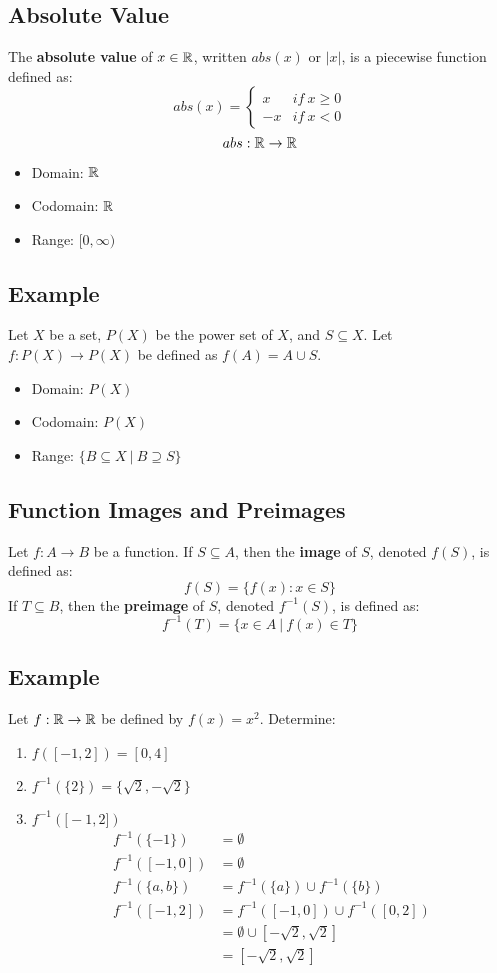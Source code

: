 \documentclass[letterpaper, 12pt]{math}
\begin{document}
\subsection*{Absolute Value}
The \textbf{absolute value} of \( x\in\mathbb{R} \), written \( abs(x) \) or \( |x| \),
is a piecewise function defined as:
\[ abs(x) =
  \begin{cases}
    x & if\ x\geq 0 \\
    -x & if\ x < 0
  \end{cases}
\]
\[ abs:\mathbb{R}\to\mathbb{R} \]
\begin{itemize}
  \item Domain: \( \mathbb{R} \)
  \item Codomain: \( \mathbb{R} \)
  \item Range: \( [0,\infty) \)
\end{itemize}

\subsection*{Example}
Let \( X \) be a set, \( P(X) \) be the power set of \( X \), and
\( S \subseteq X \). Let \( f:P(X)\to P(X) \) be defined as
\( f(A) = A \cup S \).
\begin{itemize}
  \item Domain: \( P(X) \)
  \item Codomain: \( P(X) \)
  \item Range: \( \{B \subseteq X\ |\ B \supseteq S\} \)
\end{itemize}

\subsection*{Function Images and Preimages}
Let \( f:A\to B \) be a function. If \( S \subseteq A \), then the
\textbf{image} of \( S \), denoted \( f(S) \), is defined as:
\[ f(S) = \{f(x):x\in S \} \]
If \( T \subseteq B \), then the \textbf{preimage} of \( S \), denoted
\( f^{-1}(S) \), is defined as:
\[ f^{-1}(T) = \{x\in A\ |\ f(x)\in T\} \]

\subsection*{Example}
Let \( f:\mathbb{R}\to\mathbb{R} \) be defined by \( f(x) = x^{2} \). Determine:
\begin{enumerate}
  \item \( f([-1,2]) = [0,4] \)
  \item \( f^{-1}(\{2\})  = \{\sqrt{2},-\sqrt{2}\} \)
  \item \( f^{-1}(\big[-1,2\big]) \)
  \begin{align*}
    f^{-1}(\{-1\}) &= \emptyset \\
    f^{-1}([-1,0]) &= \emptyset \\
    f^{-1}(\{a,b\}) &= f^{-1}(\{a\}) \cup f^{-1}(\{b\}) \\
    f^{-1}([-1,2]) &= f^{-1}([-1,0]) \cup f^{-1}([0,2]) \\
    &= \emptyset \cup [-\sqrt{2},\sqrt{2}] \\
    &= [-\sqrt{2},\sqrt{2}]
  \end{align*}
\end{enumerate}
\end{document}

